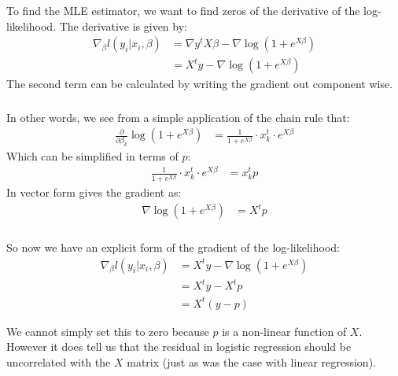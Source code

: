 \begin{frame}[fragile] \frametitle{}

To find the MLE estimator, we want to find zeros of the derivative of
the log-likelihood. The derivative is given by:
\begin{align*}
\nabla_\beta l(y_i | x_i, \beta)
&= \nabla y^t X \beta - \nabla \log(1 + e^{X\beta}) \\
&= X^t y - \nabla \log(1 + e^{X\beta})
\end{align*}
\pause The second term can be calculated by writing the gradient out
component wise.

\end{frame}

\begin{frame}[fragile] \frametitle{}

In other words, we see from a simple application of the chain
rule that:
\begin{align*}
\frac{\partial}{\partial \beta_k} \log(1 + e^{X \beta})
&= \frac{1}{1 + e^{X \beta}} \cdot x_k^t \cdot e^{X \beta}
\end{align*}
\pause Which can be simplified in terms of $p$:
\begin{align*}
\frac{1}{1 + e^{X \beta}} \cdot x_k^t \cdot e^{X \beta}
&= x_k^t p
\end{align*}
\pause In vector form gives the gradient as:
\begin{align*}
\nabla \log(1 + e^{X\beta}) &= X^t p
\end{align*}

\end{frame}

\begin{frame}[fragile] \frametitle{}

So now we have an explicit form of the gradient of the
log-likelihood:
\begin{align*}
\nabla_\beta l(y_i | x_i, \beta)
&= X^t y - \nabla \log(1 + e^{X\beta}) \\
&= X^t y - X^t p \\
&= X^t (y - p)
\end{align*}

\pause We cannot simply set this to zero because $p$ is a non-linear
function of $X$. However it does tell us that the residual in logistic
regression should be uncorrelated with the $X$ matrix (just as was
the case with linear regression).

\end{frame}

